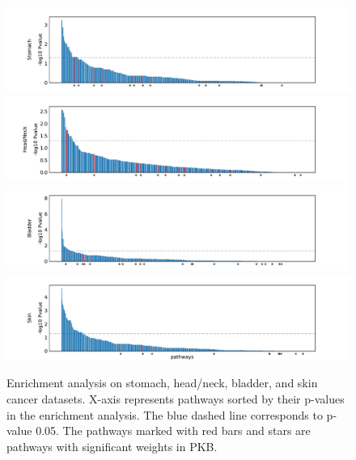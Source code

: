 \documentclass[a4paper,12pt]{article}
\begin{document}
\begin{figure}[htp]
	\centering
	\includegraphics[width=\textwidth]{GSEA_Stomach.pdf}\\ \vspace{-3mm}
	\includegraphics[width=\textwidth]{GSEA_Head_Neck.pdf}\\ \vspace{-3mm}
	\includegraphics[width=\textwidth]{GSEA_Bladder.pdf}\\ \vspace{-3mm}
	\includegraphics[width=\textwidth]{GSEA_Skin.pdf}
	\caption{Enrichment analysis on stomach, head/neck, bladder, and skin cancer datasets. X-axis represents pathways sorted by their p-values in the enrichment analysis. The blue dashed line corresponds to p-value 0.05. The pathways marked with red bars and stars are pathways with significant weights in PKB.}
\end{figure}
\newpage
\end{document}
